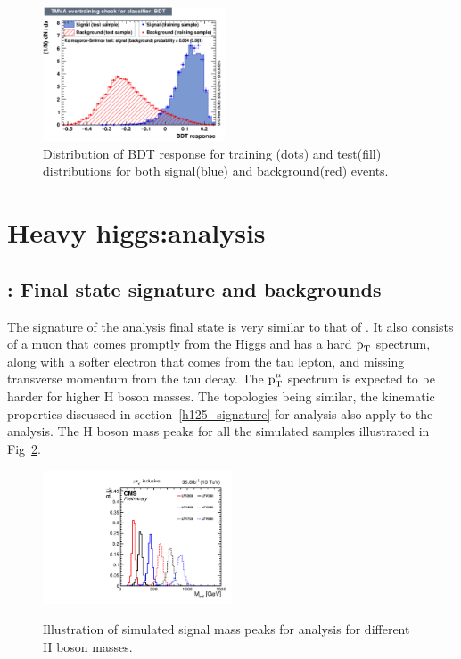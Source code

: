 \begin{figure}[htpb]
\begin{center}
\includegraphics[width=0.48\textwidth]{plots_and_figures/chapter5/overtrain_BDT.pdf}
\end{center}
\caption{Distribution of BDT response for training (dots) and test(fill) distributions for both signal(blue) and background(red) events.}
\label{fig:BDT_response}
\end{figure}

\section{ Heavy higgs:\Hmue analysis}

\subsection{\Hmue: Final state signature and backgrounds}
The signature of the \Hmue analysis final state is very similar to that of \hmue. It also consists of a muon that comes promptly from the Higgs and has a hard $\text{p}_\text{T}$ spectrum, along with a softer electron that comes from the tau lepton, and missing transverse momentum from the tau decay. The $\text{p}_\text{T}^{\mu}$ spectrum is expected to be harder for higher H boson masses. The topologies being similar, the kinematic properties discussed in section~\ref{h125_signature} for \hmue analysis also apply to the \Hmue analysis. The H boson mass peaks for all the simulated samples illustrated in Fig~\ref{fig:sig_peaks}.


\begin{figure}[htbp]
     \centering
     \includegraphics[width=0.5\textwidth]{plots_and_figures/chapter5/HM_signals_only_colmass.pdf}\\
     \caption{Illustration of simulated signal mass peaks for \Hmue analysis for different H boson masses.}
     \label{fig:sig_peaks}
\end{figure}

